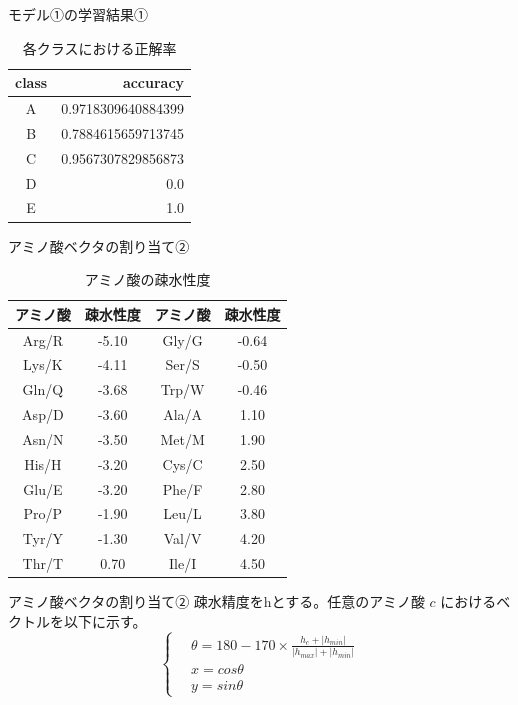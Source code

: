 \documentclass[dvipdfmx]{beamer}
\begin{document}
  \begin{frame}{モデル①の学習結果①}
    \begin{table}[H]
      \centering
      \caption{各クラスにおける正解率}
      \begin{tabular}{cr}
        \hline
        class & accuracy \\
        \hline \hline
        A & 0.9718309640884399 \\
        B & 0.7884615659713745 \\
        C & 0.9567307829856873 \\
        D & 0.0 \\
        E & 1.0 \\
        \hline
      \end{tabular}
    \end{table}
  \end{frame}

  \begin{frame}{アミノ酸ベクタの割り当て②}
    \begin{table}[h]
      \caption{アミノ酸の疎水性度}
      \begin{tabular}{cccc}
          \hline
          アミノ酸 & 疎水性度 & アミノ酸 & 疎水性度 \\
          \hline \hline 
          Arg/R & -5.10 & Gly/G & -0.64 \\
          Lys/K & -4.11 & Ser/S & -0.50 \\
          Gln/Q & -3.68 & Trp/W & -0.46 \\
          Asp/D & -3.60 & Ala/A & 1.10 \\
          Asn/N & -3.50 & Met/M & 1.90 \\
          His/H & -3.20 & Cys/C & 2.50 \\
          Glu/E & -3.20 & Phe/F & 2.80 \\
          Pro/P & -1.90 & Leu/L & 3.80 \\
          Tyr/Y & -1.30 & Val/V & 4.20 \\
          Thr/T & 0.70 & Ile/I & 4.50 \\
          \hline
      \end{tabular}
    \end{table}
  \end{frame}

  \begin{frame}{アミノ酸ベクタの割り当て②}
    疎水精度をhとする。任意のアミノ酸 \(c\) におけるベクトルを以下に示す。
    \[
      \left\{ \,
          \begin{aligned}
          & \theta = 180 - 170 \times \frac{h_c + |h_{min}|}{|h_{max}| + |h_{min}|} \\
          & x = cos{\theta} \\
          & y = sin{\theta}
          \end{aligned}
      \right.
    \]   
  \end{frame}
\end{document}
